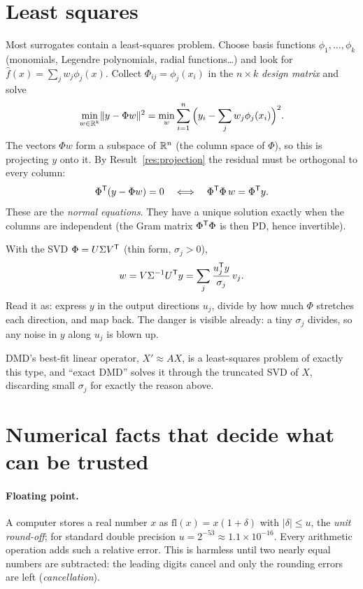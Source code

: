 \section{Least squares}
\label{sec:ls}

Most surrogates contain a least-squares problem. Choose basis functions $\phi_1, \dots, \phi_k$ (monomials, Legendre
polynomials, radial functions\dots) and look for $\hat f(x) = \sum_j w_j \phi_j(x)$. Collect $\Phi_{ij} =
\phi_j(x_i)$ in the $n\times k$ \emph{design matrix} and solve
\begin{equation}
  \min_{w \in \mathbb{R}^k} \lVert y - \Phi w\rVert^2 = \min_w \sum_{i=1}^n \Big(y_i - \sum_j w_j \phi_j(x_i)\Big)^2 .
\end{equation}
The vectors $\Phi w$ form a subspace of $\mathbb{R}^n$ (the column space of $\Phi$), so this is projecting $y$ onto it.
By Result~\ref{res:projection} the residual must be orthogonal to every column:
\begin{equation}
  \Phi^{\mathsf{T}} (y - \Phi w) = 0 \quad\Longleftrightarrow\quad \Phi^{\mathsf{T}}\Phi\, w = \Phi^{\mathsf{T}} y .
  \label{eq:normal}
\end{equation}
These are the \emph{normal equations}. They have a unique solution exactly when the columns are independent (the
Gram matrix $\Phi^{\mathsf{T}}\Phi$ is then PD, hence invertible).

With the SVD $\Phi = U \Sigma V^{\mathsf{T}}$ (thin form, $\sigma_j > 0$),
\begin{equation}
  w = V \Sigma^{-1} U^{\mathsf{T}} y = \sum_j \frac{u_j^{\mathsf{T}} y}{\sigma_j}\, v_j .
  \label{eq:ls_svd}
\end{equation}
Read it as: express $y$ in the output directions $u_j$, divide by how much $\Phi$ stretches each direction, and map
back. The danger is visible already: a tiny $\sigma_j$ divides, so any noise in $y$ along $u_j$ is blown up.

\begin{connection}
DMD's best-fit linear operator, $X' \approx A X$, is a least-squares problem of exactly this type, and ``exact DMD''
solves it through the truncated SVD of $X$, discarding small $\sigma_j$ for exactly the reason above.
\end{connection}

\section{Numerical facts that decide what can be trusted}
\label{sec:numerics}

\paragraph{Floating point.} A computer stores a real number $x$ as $\mathrm{fl}(x) = x(1 + \delta)$ with
$|\delta| \le u$, the \emph{unit round-off}; for standard double precision $u = 2^{-53} \approx 1.1 \times
10^{-16}$. Every arithmetic operation adds such a relative error. This is harmless until two nearly equal numbers are
subtracted: the leading digits cancel and only the rounding errors are left (\emph{cancellation}).

